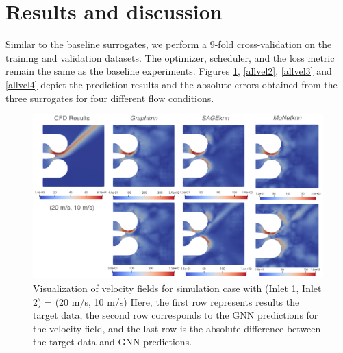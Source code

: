 \section{Results and discussion}
Similar to the baseline surrogates, we perform a 9-fold cross-validation on the training and validation datasets. The optimizer, scheduler, and the loss metric remain the same as the baseline experiments. Figures \ref{allvel1}, \ref{allvel2}, \ref{allvel3} and \ref{allvel4} depict the prediction results and the absolute errors obtained from the three surrogates for four different flow conditions. 
\begin{figure}[ht]
    \centering
    \includegraphics[width=14cm]{images/Methodology/Asset 18.png}
    \caption{Visualization of velocity fields for simulation case with (Inlet 1, Inlet 2) = (20 m/s, 10 m/s) Here, the first row represents results the target data, the second row corresponds to the GNN predictions for the velocity field, and the last row is the absolute difference between the target data and GNN predictions.} 
    \label{allvel1}
\end{figure}
